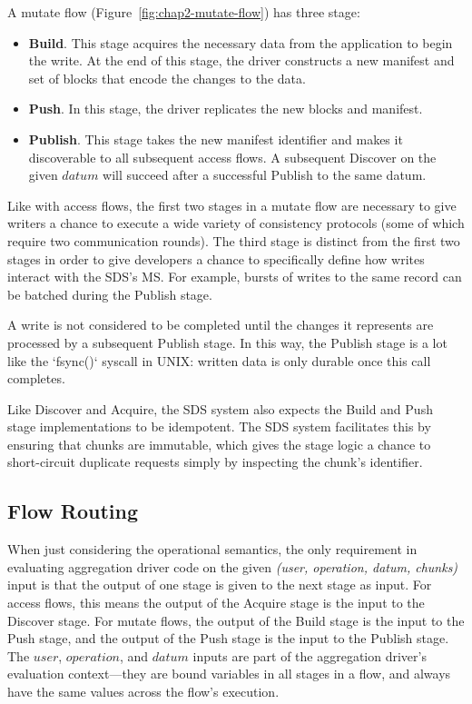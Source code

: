 A mutate flow (Figure~\ref{fig:chap2-mutate-flow}) has three stage:

\begin{itemize}
    \item \textbf{Build}.  This stage acquires the necessary data from the
application to begin the write.  At the end of this stage, the driver constructs
a new manifest and set of blocks that encode the changes to the data. 
    \item \textbf{Push}.  In this stage, the driver replicates the new blocks and
manifest.
    \item \textbf{Publish}.  This stage takes the new manifest identifier and makes
it discoverable to all subsequent access flows.  A subsequent Discover on the
given $datum$ will succeed after a successful Publish to the same datum.
\end{itemize}

Like with access flows, the first two stages in a mutate flow are necessary to give writers a
chance to execute a wide variety of consistency protocols (some of which require
two communication rounds).  The third stage is distinct from the first two stages
in order to give developers a chance to specifically define how writes
interact with the SDS's MS.  For example, bursts of writes to the same record
can be batched during the Publish stage.

A write is not considered to be completed until the changes it represents are
processed by a subsequent Publish stage.  In this way, the Publish stage is a lot
like the `fsync()` syscall in UNIX:  written data is only durable once this call
completes.

Like Discover and Acquire, the SDS system also expects the Build and Push stage
implementations to be idempotent.  The SDS system facilitates this by ensuring
that chunks are immutable, which gives the stage logic a chance to short-circuit
duplicate requests simply by inspecting the chunk's identifier.

\subsection{Flow Routing}

When just considering the operational semantics, the only requirement in evaluating
aggregation driver code on the given \textit{(user, operation, datum, chunks)} input is
that the output of one stage is given to the next stage as input.  For access
flows, this means the output of the Acquire stage is the input to the Discover
stage.  For mutate flows, the output of the Build stage is the input to the Push
stage, and the output of the Push stage is the input to the Publish stage.  The
$user$, $operation$, and $datum$ inputs are part of the aggregation driver's
evaluation context---they are bound variables in all stages in a flow, and
always have the same values across the flow's execution.

